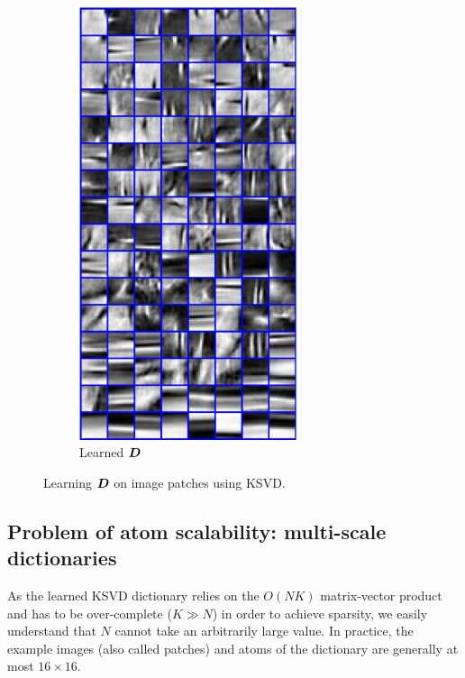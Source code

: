 \begin{figure}[!ht]
\begin{subfigure}[b]{0.29\textwidth}
	\includegraphics[width=0.7\textwidth]{figures/ksvd/dictionary.pdf}
	\caption{Learned $\bm{D}$}\label{fig_ksvd_dict}
\end{subfigure}
\caption{Learning $\bm{D}$ on image patches using \ac{KSVD}.}\label{fig_ksvd}
\end{figure}


\subsection{Problem of atom scalability: multi-scale dictionaries}
As the learned \ac{KSVD} dictionary relies on the $O(NK)$ matrix-vector product and has to be over-complete ($K \gg N$) in order to achieve sparsity, we easily understand that $N$ cannot take an arbitrarily large value. In practice, the example images (also called patches) and atoms of the dictionary are generally at most $16 \times 16$.

